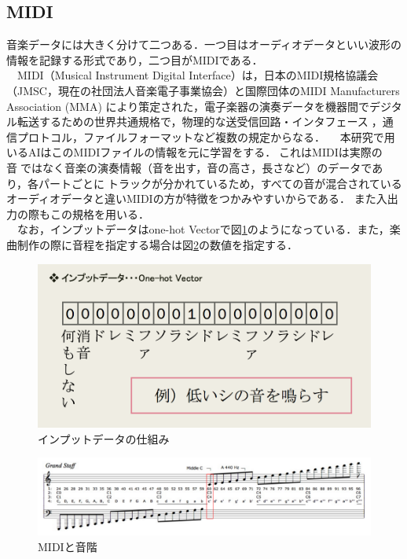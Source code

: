 \subsection{MIDI}
音楽データには大きく分けて二つある．一つ目はオーディオデータといい波形の情報を記録する形式であり，二つ目がMIDIである．\\
　MIDI（Musical Instrument Digital Interface）は，日本のMIDI規格協議会（JMSC，現在の社団法人音楽電子事業協会）と国際団体のMIDI Manufacturers Association (MMA) により策定された，電子楽器の演奏データを機器間でデジタル転送するための世界共通規格で，物理的な送受信回路・インタフェース，通信プロトコル，ファイルフォーマットなど複数の規定からなる．
　本研究で用いるAIはこのMIDIファイルの情報を元に学習をする．これはMIDIは実際の音ではなく音楽の演奏情報（音を出す，音の高さ，長さなど）のデータであり，各パートごとにトラックが分かれているため，すべての音が混合されているオーディオデータと違いMIDIの方が特徴をつかみやすいからである．
また入出力の際もこの規格を用いる．\\
　なお，インプットデータはone-hot Vectorで図\ref{fig:インプットデータの仕組み}のようになっている．また，楽曲制作の際に音程を指定する場合は図\ref{fig:MIDIと音階}の数値を指定する．
\begin{figure}[h]
    \begin{screen}
    \begin{center}
        \includegraphics[scale=0.85,clip]{./img/midi1.png}
        \caption{インプットデータの仕組み}
        \label{fig:インプットデータの仕組み}
    \end{center}
    \end{screen}
\end{figure}
\newpage
\begin{figure}[h]
    \begin{screen}
    \begin{center}
        \includegraphics[scale=0.45,clip]{./img/midi2.png}
        \caption{MIDIと音階}
        \label{fig:MIDIと音階}
    \end{center}
    \end{screen}
\end{figure}
\newpage
